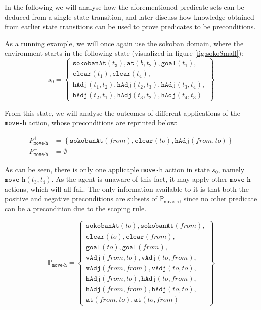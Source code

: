 \documentclass[../Master.tex]{subfiles}
\begin{document}
In the following we will analyse how the aforementioned predicate sets can be deduced from a single state transition, and later discuss how knowledge obtained from earlier state transitions can be used to prove predicates to be preconditions.

As a running example, we will once again use the sokoban domain, where the environment starts in the following state (visualized in figure \ref{fig:sokoSmall}):
\begin{equation*}
    s_0 =
    \left\{
        \begin{gathered}
            \texttt{sokobanAt}(t_3), \texttt{at}(b, t_2), \texttt{goal}(t_1), \\
            \texttt{clear}(t_1), \texttt{clear}(t_4), \\
            \texttt{hAdj}(t_1, t_2), \texttt{hAdj}(t_2, t_3),
            \texttt{hAdj}(t_3, t_4), \\
            \texttt{hAdj}(t_2, t_1), \texttt{hAdj}(t_3, t_2),
            \texttt{hAdj}(t_4, t_3)
        \end{gathered}
    \right\}
\end{equation*}

From this state, we will analyse the outcomes of different applications of the \texttt{move-h} action, whose preconditions are reprinted below:

\begin{align*}
    P_{\texttt{move-h}}^+ &= \left\{
        \texttt{sokobanAt}(from), \texttt{clear}(to), \texttt{hAdj}(from, to)
        \right\} \\
    P_{\texttt{move-h}}^- &= \emptyset
\end{align*}

As can be seen, there is only one applicaple \texttt{move-h} action in state $s_0$, namely $\texttt{move-h}(t_3,t_4)$. As the agent is unaware of this fact, it may apply other $\texttt{move-h}$ actions, which will all fail. The only information available to it is that both the positive and negative preconditions are subsets of $\mathbb{P}_{\texttt{move-h}}$, since no other predicate can be a precondition due to the scoping rule.

\begin{equation*}
\mathbb{P}_{\texttt{move-h}} =
\left\{
    \begin{gathered}
        \texttt{sokobanAt}(to), \texttt{sokobanAt}(from), \\
        \texttt{clear}(to), \texttt{clear}(from), \\
        \texttt{goal}(to), \texttt{goal}(from), \\
        \texttt{vAdj}(from, to), \texttt{vAdj}(to, from), \\
        \texttt{vAdj}(from, from), \texttt{vAdj}(to, to), \\
        \texttt{hAdj}(from, to), \texttt{hAdj}(to, from), \\
        \texttt{hAdj}(from, from), \texttt{hAdj}(to, to), \\
        \texttt{at}(from, to), \texttt{at}(to, from)
    \end{gathered}
\right\}
\end{equation*}
\end{document}
